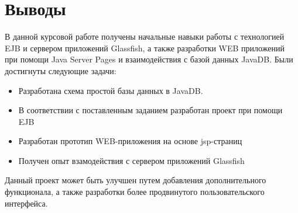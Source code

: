 \section{Выводы}
В данной курсовой работе получены начальные навыки работы с технологией EJB и сервером приложений Glassfish, а также разработки WEB приложений при помощи Java Server Pages и взаимодействия с базой данных JavaDB.
Были достигнуты следующие задачи:
\begin{itemize}
	\item Разработана схема простой базы данных в JavaDB.
	\item В соответствии с поставленным заданием разработан проект при помощи EJB
	\item Разработан прототип WEB-приложения на основе jsp-страниц
	\item Получен опыт взамодействия с сервером приложений Glassfish
\end{itemize}
Данный проект может быть улучшен путем добавления дополнительного функционала, а также разработки более продвинутого пользовательского интерфейса.